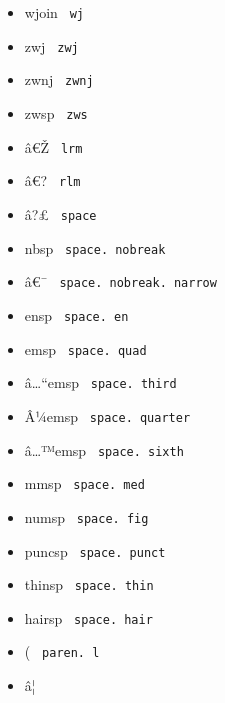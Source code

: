 \begin{itemize}
\tightlist
\item
  \label{symbol-wj}{{ wjoin } \texttt{\ wj\ }}
\item
  \label{symbol-zwj}{{ zwj } \texttt{\ zwj\ }}
\item
  \label{symbol-zwnj}{{ zwnj } \texttt{\ zwnj\ }}
\item
  \label{symbol-zws}{{ zwsp } \texttt{\ zws\ }}
\item
  \label{symbol-lrm}{{ â€Ž } \texttt{\ lrm\ }}
\item
  \label{symbol-rlm}{{ â€? } \texttt{\ rlm\ }}
\item
  \label{symbol-space}{{ â?£ } \texttt{\ space\ }}
\item
  \label{symbol-space.nobreak}{{ nbsp }
  \texttt{\ space.\ nobreak\ }}
\item
  \label{symbol-space.nobreak.narrow}{{ â€¯ }
  \texttt{\ space.\ nobreak.\ narrow\ }}
\item
  \label{symbol-space.en}{{ ensp }
  \texttt{\ space.\ en\ }}
\item
  \label{symbol-space.quad}{{ emsp }
  \texttt{\ space.\ quad\ }}
\item
  \label{symbol-space.third}{{ â\ldots``emsp }
  \texttt{\ space.\ third\ }}
\item
  \label{symbol-space.quarter}{{ Â¼emsp }
  \texttt{\ space.\ quarter\ }}
\item
  \label{symbol-space.sixth}{{ â\ldots™emsp }
  \texttt{\ space.\ sixth\ }}
\item
  \label{symbol-space.med}{{ mmsp }
  \texttt{\ space.\ med\ }}
\item
  \label{symbol-space.fig}{{ numsp }
  \texttt{\ space.\ fig\ }}
\item
  \label{symbol-space.punct}{{ puncsp }
  \texttt{\ space.\ punct\ }}
\item
  \label{symbol-space.thin}{{ thinsp }
  \texttt{\ space.\ thin\ }}
\item
  \label{symbol-space.hair}{{ hairsp }
  \texttt{\ space.\ hair\ }}
\item
  \label{symbol-paren.l}{{ ( } \texttt{\ paren.\ l\ }}
\item
  \label{symbol-paren.l.double}{{ â¦ }
}
\end{itemize}
